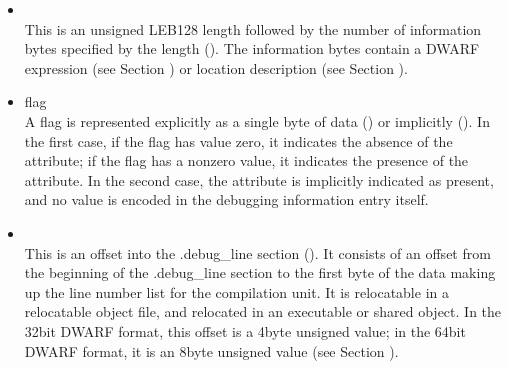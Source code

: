 \begin{itemize}
The data in , 
, 
 and
can be anything. Depending on context, it may
be a signed integer, an unsigned integer, a floating\dash point
constant, or anything else. A consumer must use context to
know how to interpret the bits, which if they are target
machine data (such as an integer or floating point constant)
will be in target machine byte\dash order.

\textit{If one of the <n> forms is used to represent a
signed or unsigned integer, it can be hard for a consumer
to discover the context necessary to determine which
interpretation is intended. Producers are therefore strongly
encouraged to use  or 
 for signed and
unsigned integers respectively, rather than 
 \textless n \textgreater.}


\item {} \\
This is an unsigned LEB128 length followed by the
number of information bytes specified by the length
(). 
The information bytes contain a DWARF
expression 
(see Section ) 
or location description 
(see Section ).

\item flag \\
A flag is represented explicitly as a single byte of data
() or 
implicitly (). In the
first case, if the flag has value zero, it indicates the
absence of the attribute; if the flag has a non\dash zero value,
it indicates the presence of the attribute. In the second
case, the attribute is implicitly indicated as present, and
no value is encoded in the debugging information entry itself.

\item {} \\
This is an offset into the .debug\_line section
(). It consists of an offset from the
beginning of the .debug\_line section to the first byte of
the data making up the line number list for the compilation
unit. 
It is relocatable in a relocatable object file, and
relocated in an executable or shared object. In the 32\dash bit
DWARF format, this offset is a 4\dash byte unsigned value;
in the 64\dash bit DWARF format, it is an 8\dash byte unsigned value
(see Section ).



\end{itemize}
